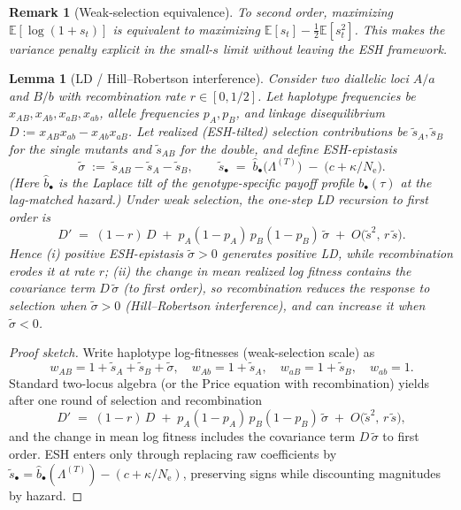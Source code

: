 \documentclass[11pt]{article}
\theoremstyle{upright}
\newtheorem{lemma}{Lemma}
\newtheorem{remark}{Remark}
\newcommand{\Ne}{N_{\mathrm{e}}}
\newcommand{\hazT}[1]{\Lambda^{(#1)}}          %
\begin{document}
\begin{remark}[Weak-selection equivalence]
To second order, maximizing $\mathbb E[\log(1+s_t)]$ is equivalent to maximizing $\mathbb E[s_t]-\tfrac12\mathbb E[s_t^2]$.
This makes the variance penalty explicit in the small-$s$ limit without leaving the ESH framework.
\end{remark}

\begin{lemma}[LD / Hill--Robertson interference]\label{lem:ld}
Consider two diallelic loci $A/a$ and $B/b$ with recombination rate $r\in[0,1/2]$.
Let haplotype frequencies be $x_{AB},x_{Ab},x_{aB},x_{ab}$, allele frequencies $p_A,p_B$, and linkage disequilibrium $D:=x_{AB}x_{ab}-x_{Ab}x_{aB}$.
Let realized (ESH-tilted) selection contributions be
$\tilde s_A,\tilde s_B$ for the single mutants and $\tilde s_{AB}$ for the double, and define ESH-epistasis
\[
\tilde\sigma \;:=\; \tilde s_{AB} - \tilde s_A - \tilde s_B,
\qquad
\tilde s_\bullet \;=\; \widehat b_\bullet\!\big(\hazT{T}\big) \;-\; \big(c+\kappa/\Ne\big).
\]
(Here $\widehat b_\bullet$ is the Laplace tilt of the \emph{genotype-specific} payoff profile $b_\bullet(\tau)$ at the lag-matched hazard.)
Under \emph{weak selection}, the one-step LD recursion to first order is
\begin{equation}\label{eq:LD-QLE}
D' \;=\; (1-r)\,D \;+\; p_A(1-p_A)\,p_B(1-p_B)\,\tilde\sigma \;+\; O\!\big(\tilde s^2,\, r\,\tilde s\big).
\end{equation}
Hence (i) positive ESH-epistasis $\tilde\sigma>0$ generates \emph{positive} LD, while recombination erodes it at rate $r$; (ii) the change in mean realized log fitness contains the covariance term $D\,\tilde\sigma$ (to first order), so recombination reduces the response to selection when $\tilde\sigma>0$ (Hill--Robertson interference), and can increase it when $\tilde\sigma<0$.
\end{lemma}

\begin{proof}[Proof sketch]
Write haplotype log-fitnesses (weak-selection scale) as
\[
w_{AB}=1+\tilde s_A+\tilde s_B+\tilde\sigma,\quad
w_{Ab}=1+\tilde s_A,\quad
w_{aB}=1+\tilde s_B,\quad
w_{ab}=1.
\]
Standard two-locus algebra (or the Price equation with recombination) yields after one round of selection and recombination
\[
D' \;=\; (1-r)\,D \;+\; p_A(1-p_A)\,p_B(1-p_B)\,\tilde\sigma \;+\; O\!\big(\tilde s^2,\, r\,\tilde s\big),
\]
and the change in mean log fitness includes the covariance term $D\,\tilde\sigma$ to first order.
ESH enters only through replacing raw coefficients by $\tilde s_\bullet=\widehat b_\bullet(\hazT{T})-(c+\kappa/\Ne)$, preserving signs while discounting magnitudes by hazard.
\end{proof}
\end{document}
